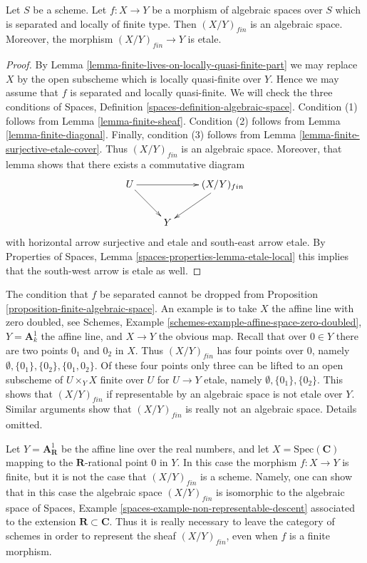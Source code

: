 \begin{proposition}
\label{proposition-finite-algebraic-space}
Let $S$ be a scheme.
Let $f : X \to Y$ be a morphism of algebraic spaces over $S$ which
is separated and locally of finite type. Then $(X/Y)_{fin}$
is an algebraic space. Moreover, the morphism
$(X/Y)_{fin} \to Y$ is etale.
\end{proposition}

\begin{proof}
By
Lemma \ref{lemma-finite-lives-on-locally-quasi-finite-part}
we may replace $X$ by the open subscheme which is locally quasi-finite
over $Y$. Hence we may assume that $f$ is separated and locally quasi-finite.
We will check the three conditions of
Spaces, Definition \ref{spaces-definition-algebraic-space}.
Condition (1) follows from
Lemma \ref{lemma-finite-sheaf}.
Condition (2) follows from
Lemma \ref{lemma-finite-diagonal}.
Finally, condition (3) follows from
Lemma \ref{lemma-finite-surjective-etale-cover}.
Thus $(X/Y)_{fin}$ is an algebraic space.
Moreover, that lemma shows that there exists a commutative
diagram
$$
\xymatrix{
U \ar[rr] \ar[rd] & & (X/Y)_{fin} \ar[ld] \\
& Y
}
$$
with horizontal arrow surjective and etale and south-east arrow
etale. By
Properties of Spaces, Lemma \ref{spaces-properties-lemma-etale-local}
this implies that the south-west arrow is etale as well.
\end{proof}

\begin{remark}
\label{remark-warning}
The condition that $f$ be separated cannot be dropped from
Proposition \ref{proposition-finite-algebraic-space}.
An example is to take $X$ the affine line with zero doubled, see
Schemes, Example \ref{schemes-example-affine-space-zero-doubled},
$Y = \mathbf{A}^1_k$ the affine line, and $X \to Y$ the obvious map.
Recall that over $0 \in Y$ there are two points $0_1$ and $0_2$
in $X$. Thus $(X/Y)_{fin}$ has four points over $0$, namely
$\emptyset, \{0_1\}, \{0_2\}, \{0_1, 0_2\}$.
Of these four points only three can be lifted to an open
subscheme of $U \times_Y X$ finite over $U$ for $U \to Y$ etale,
namely $\emptyset, \{0_1\}, \{0_2\}$. This shows that $(X/Y)_{fin}$
if representable by an algebraic space is not etale over $Y$.
Similar arguments show that $(X/Y)_{fin}$ is really not an algebraic
space. Details omitted.
\end{remark}

\begin{remark}
\label{remark-not-scheme}
Let $Y = \mathbf{A}^1_{\mathbf{R}}$ be the affine line over the real
numbers, and let $X = \text{Spec}(\mathbf{C})$ mapping to the
$\mathbf{R}$-rational point $0$ in $Y$. In this case the morphism
$f : X \to Y$ is finite, but it is not the case that $(X/Y)_{fin}$
is a scheme. Namely, one can show that in this case the algebraic
space $(X/Y)_{fin}$ is isomorphic to the algebraic space of
Spaces, Example \ref{spaces-example-non-representable-descent}
associated to the extension $\mathbf{R} \subset \mathbf{C}$.
Thus it is really necessary to leave the category of schemes
in order to represent the sheaf $(X/Y)_{fin}$, even when $f$
is a finite morphism.
\end{remark}

